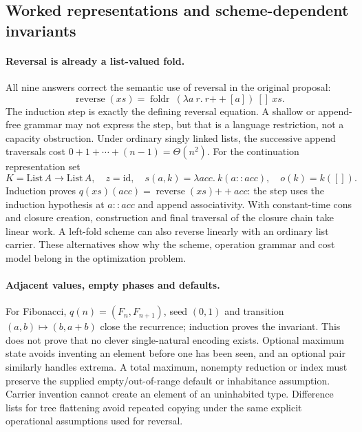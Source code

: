 \subsection{Worked representations and scheme-dependent invariants}
\label{sec:carrier-worked}

\paragraph{Reversal is already a list-valued fold.}
\label{sec:carrier-reverse}
All nine answers correct the semantic use of reversal in the original proposal:
\[
 \operatorname{reverse}(xs)=
 \operatorname{foldr}\ (\lambda a\ r.\ r\mathbin{+\!+}[a])\ []\ xs.
\]
The induction step is exactly the defining reversal equation. A shallow or
append-free grammar may not express the step, but that is a language
restriction, not a capacity obstruction. Under ordinary singly linked lists,
the successive append traversals cost $0+1+\cdots+(n-1)=\Theta(n^2)$.
For the continuation representation set
\[
 K=\mathrm{List}\,A\to\mathrm{List}\,A,\quad z=\mathrm{id},\quad
 s(a,k)=\lambda acc.\ k(a::acc),\quad o(k)=k([]).
\]
Induction proves $q(xs)(acc)=\operatorname{reverse}(xs)\mathbin{+\!+}acc$:
the step uses the induction hypothesis at $a::acc$ and append associativity.
With constant-time cons and closure creation, construction and final traversal
of the closure chain take linear work. A left-fold scheme can also reverse
linearly with an ordinary list carrier. These alternatives show why the
scheme, operation grammar and cost model belong in the optimization problem.

\paragraph{Adjacent values, empty phases and defaults.}
For Fibonacci, $q(n)=(F_n,F_{n+1})$, seed $(0,1)$ and transition
$(a,b)\mapsto(b,a+b)$ close the recurrence; induction proves the invariant.
This does not prove that no clever single-natural encoding exists. Optional
maximum state avoids inventing an element before one has been seen, and an
optional pair similarly handles extrema. A total maximum, nonempty reduction
or index must preserve the supplied empty/out-of-range default or inhabitance
assumption. Carrier invention cannot create an element of an uninhabited
type. Difference lists for tree flattening avoid repeated copying under the
same explicit operational assumptions used for reversal.

